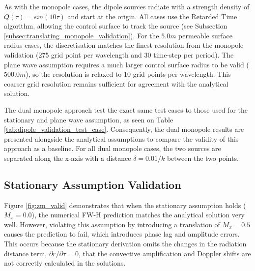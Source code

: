 As with the monopole cases, the dipole sources radiate with a strength density of $Q(\tau)=sin(10\tau)$ and start at the origin. All cases use the Retarded Time algorithm, allowing the control surface to track the source (see Subsection \ref{subsec:translating_monopole_validation}). For the $5.0m$ permeable surface radius cases, the discretisation matches the finest resolution from the monopole validation (275 grid point per wavelength and 30 time-step per period). The plane wave assumption requires a much larger control surface radius to be valid ($500.0m$), so the resolution is relaxed to 10 grid points per wavelength. This coarser grid resolution remains sufficient for agreement with the analytical solution.

The dual monopole approach test the exact same test cases to those used for the stationary and plane wave assumption, as seen on Table \ref{tab:dipole_validation_test_case}. Consequently, the dual monopole results are presented alongside the analytical assumptions to compare the validity of this approach as a baseline. For all dual monopole cases, the two sources are separated along the x-axis with a distance $\delta=0.01/k$ between the two points.

\clearpage

\subsection{Stationary Assumption Validation} \label{subsec:dipole_validation_stationary}

Figure \ref{fig:zm_valid} demonstrates that when the stationary assumption holds ($M_x=0.0$), the numerical FW-H prediction matches the analytical solution very well. However, violating this assumption by introducing a translation of $M_x=0.5$ causes the prediction to fail, which introduces phase lag and amplitude errors. This occurs because the stationary derivation omits the changes in the radiation distance term, $\partial r/\partial\tau=0$, that the convective amplification and Doppler shifts are not correctly calculated in the solutions.

